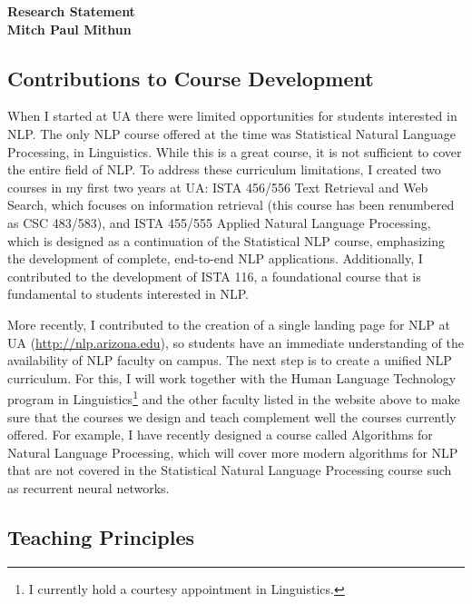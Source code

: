 \documentclass[10pt]{article}
\begin{document}

\begin{center}
{\Large \bf Research Statement\\
\smallskip
{\large \bf Mitch Paul Mithun }}
\end{center}

\subsection*{Contributions to Course Development}

When I started at UA there were limited opportunities for students interested in NLP. The only NLP course offered at the time was Statistical Natural Language Processing, in Linguistics. While this is a great course, it is not sufficient to cover the entire field of NLP. 
To address these curriculum limitations, I created two courses in my first two years at UA: ISTA 456/556 Text Retrieval and Web Search, which focuses on information retrieval (this course has been renumbered as CSC 483/583), and ISTA 455/555 Applied Natural Language Processing, which is designed as a continuation of the Statistical NLP course, emphasizing the development of complete, end-to-end NLP applications.  Additionally, I contributed to the development of ISTA 116, a foundational course that is fundamental to students interested in NLP.

More recently, I contributed to the creation of a single landing page for NLP at UA (\url{http://nlp.arizona.edu}), so students have an immediate understanding of the availability of NLP faculty on campus. The next step is to create a unified NLP curriculum. For this, I will work together with the Human Language Technology program in Linguistics\footnote{I currently hold a courtesy appointment in Linguistics.} and the other faculty listed in the website above to make sure that the courses we design and teach complement well the courses currently offered. For example, I have recently designed a course called Algorithms for Natural Language Processing, which will cover more modern algorithms for NLP that are not covered in the Statistical Natural Language Processing course such as recurrent neural networks.

\subsection*{Teaching Principles}
\end{document}
